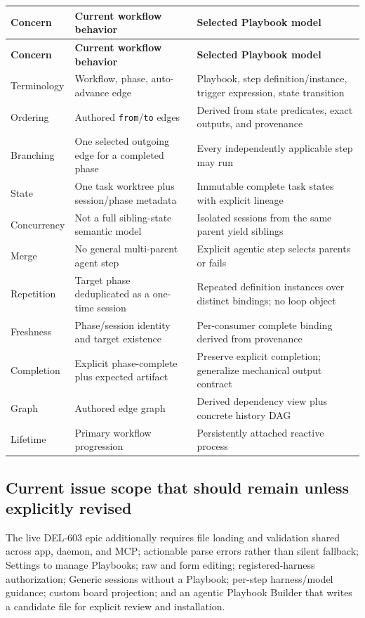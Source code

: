 \documentclass[11pt]{article}
\begin{document}
\begin{longtable}{@{}L{1.35in}L{2.35in}L{2.80in}@{}}
\toprule
\textbf{Concern} & \textbf{Current workflow behavior} & \textbf{Selected Playbook model} \\
\midrule
\endfirsthead
\toprule
\textbf{Concern} & \textbf{Current workflow behavior} & \textbf{Selected Playbook model} \\
\midrule
\endhead
Terminology & Workflow, phase, auto-advance edge & Playbook, step definition/instance, trigger expression, state transition \\
Ordering & Authored \texttt{from}/\texttt{to} edges & Derived from state predicates, exact outputs, and provenance \\
Branching & One selected outgoing edge for a completed phase & Every independently applicable step may run \\
State & One task worktree plus session/phase metadata & Immutable complete task states with explicit lineage \\
Concurrency & Not a full sibling-state semantic model & Isolated sessions from the same parent yield siblings \\
Merge & No general multi-parent agent step & Explicit agentic step selects parents or fails \\
Repetition & Target phase deduplicated as a one-time session & Repeated definition instances over distinct bindings; no loop object \\
Freshness & Phase/session identity and target existence & Per-consumer complete binding derived from provenance \\
Completion & Explicit phase-complete plus expected artifact & Preserve explicit completion; generalize mechanical output contract \\
Graph & Authored edge graph & Derived dependency view plus concrete history DAG \\
Lifetime & Primary workflow progression & Persistently attached reactive process \\
\bottomrule
\end{longtable}

\subsection{Current issue scope that should remain unless explicitly revised}

The live DEL-603 epic additionally requires file loading and validation shared across app, daemon, and MCP; actionable parse errors rather than silent fallback; Settings to manage Playbooks; raw and form editing; registered-harness authorization; Generic sessions without a Playbook; per-step harness/model guidance; custom board projection; and an agentic Playbook Builder that writes a candidate file for explicit review and installation.
\end{document}
